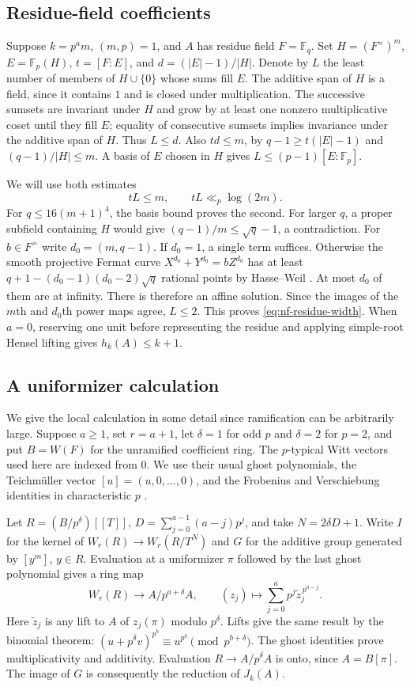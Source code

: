 \documentclass[11pt,letterpaper]{article}
\theoremstyle{definition}
\numberwithin{equation}{section}
\begin{document}
\subsection{Residue-field coefficients}
Suppose $k=p^a m$, $(m,p)=1$, and $A$ has residue field
$F=\mathbb F_q$. Set $H=(F^\times)^m$, $E=\mathbb F_p(H)$,
$t=[F:E]$, and $d=(|E|-1)/|H|$. Denote by $L$ the least number of
members of $H\cup\{0\}$ whose sums fill $E$. The additive span of $H$
is a field, since it contains $1$ and is closed under multiplication.
The successive sumsets are invariant under $H$ and grow by at least
one nonzero multiplicative coset until they fill $E$; equality of
consecutive sumsets implies invariance under the additive span of $H$.
Thus $L\le d$. Also $td\le m$, by $q-1\ge t(|E|-1)$ and
$(q-1)/|H|\le m$. A basis of $E$ chosen in $H$ gives
$L\le(p-1)[E:\mathbb F_p]$.

We will use both estimates
\begin{equation}\label{eq:nf-residue-width}
 tL\le m,\qquad tL\ll_p\log(2m).
\end{equation}
For $q\le 16(m+1)^4$, the basis bound proves the second. For larger
$q$, a proper subfield containing $H$ would give
$(q-1)/m\le\sqrt q-1$, a contradiction. For $b\in F^\times$ write
$d_0=(m,q-1)$. If $d_0=1$, a single term suffices. Otherwise the
smooth projective Fermat curve $X^{d_0}+Y^{d_0}=bZ^{d_0}$
has at least $q+1-(d_0-1)(d_0-2)\sqrt q$ rational points by
Hasse--Weil \cite{NFWeilCurves}. At most $d_0$ of them are at infinity.
There is therefore an affine solution. Since the images of the
$m$th and $d_0$th power maps agree, $L\le2$. This proves
\eqref{eq:nf-residue-width}. When $a=0$, reserving one unit before
representing the residue and applying simple-root Hensel lifting gives
$h_k(A)\le k+1$.

\subsection{A uniformizer calculation}
We give the local calculation in some detail since ramification can be
arbitrarily large. Suppose $a\ge1$, set $r=a+1$, let $\delta=1$ for
odd $p$ and $\delta=2$ for $p=2$, and put $B=W(F)$ for the unramified
coefficient ring. The $p$-typical Witt vectors used here are indexed
from $0$. We use their usual ghost polynomials, the Teichm\"uller vector
$[u]=(u,0,\ldots,0)$, and the Frobenius and Verschiebung identities
in characteristic $p$ \cite{NFHazewinkel}.

Let $R=(B/p^\delta)[[T]]$, $D=\sum_{j=0}^{a-1}(a-j)p^j$,
and take $N=2\delta D+1$. Write $I$ for the kernel of
$W_r(R)\longrightarrow W_r(R/T^N)$ and $G$ for the additive group
generated by $[y^m]$, $y\in R$. Evaluation at a uniformizer $\pi$
followed by the last ghost polynomial gives a ring map
\[
 W_r(R)\longrightarrow A/p^{a+\delta}A,\qquad
 (z_j)\longmapsto\sum_{j=0}^a p^j\widetilde z_j^{\,p^{a-j}} .
\]
Here $\widetilde z_j$ is any lift to $A$ of $z_j(\pi)$ modulo $p^\delta$.
Lifts give the same result by the binomial theorem:
$(u+p^\delta v)^{p^b}\equiv u^{p^b}\pmod {p^{b+\delta}}$.
The ghost identities prove multiplicativity and additivity.
Evaluation $R\to A/p^\delta A$ is onto, since $A=B[\pi]$.
The image of $G$ is consequently the reduction of $J_k(A)$.
\end{document}
